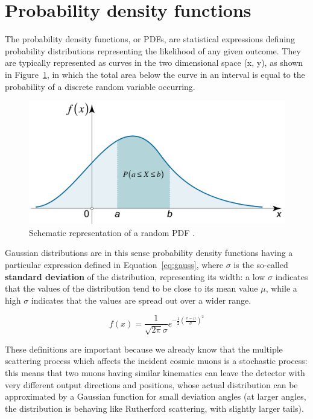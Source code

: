 \documentclass[a4paper, 11pt]{report}
\begin{document}
\section{Probability density functions} \label{sec:PDF}

The probability density functions, or PDFs, are statistical expressions defining probability distributions representing the likelihood of any given outcome. They are typically represented as curves in the two dimensional space (x, y), as shown in Figure~\ref{fig:PDF}, in which the total area below the curve in an interval is equal to the probability of a discrete random variable occurring. 

\begin{figure}[htbp]
\begin{center}
\includegraphics[width=12cm, height=5.4cm]{figs/PDF.png}
\caption{Schematic representation of a random PDF \cite{PDF}.}
\label{fig:PDF}
\end{center}
\end{figure}

Gaussian distributions are in this sense probability density functions having a particular expression defined in Equation~\ref{eq:gauss}, where $\sigma$ is the so-called \textbf{standard deviation} of the distribution, representing its width: a low $\sigma$ indicates that the values of the distribution tend to be close to its mean value $\mu$, while a high $\sigma$ indicates that the values are spread out over a wider range.

\begin{equation}
\label{eq:gauss}
f(x) = \frac{1}{\sqrt{2 \pi} \sigma} e^{-\frac{1}{2} \left (\frac{x - \mu}{\sigma} \right )^2}
\end{equation}

These definitions are important because we already know that the multiple scattering process which affects the incident cosmic muons is a stochastic process: this means that two muons having similar kinematics can leave the detector with very different output directions and positions, whose actual distribution can be approximated by a Gaussian function for small deviation angles (at larger angles, the distribution is behaving like Rutherford scattering, with slightly larger tails). 
\end{document}
